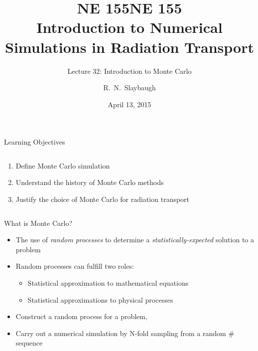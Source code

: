 \documentclass[xcolor=x11names,compress]{beamer}
\title{NE 155}
\author{R.\ N.\ Slaybaugh}
\date{April 13, 2015}
\renewcommand{\(}{\begin{columns}}
\renewcommand{\)}{\end{columns}}
\newcommand{\<}[1]{\begin{column}{#1}}
\renewcommand{\>}{\end{column}}
\begin{document}
\begin{frame}
\title{NE 155\\Introduction to Numerical Simulations in Radiation Transport}
\subtitle{Lecture 32: Introduction to Monte Carlo}
\titlepage
\end{frame}

\begin{frame}{Learning Objectives}

\begin{columns}
  \begin{column}{0.6\textwidth}
    \begin{enumerate}
    \item Define Monte Carlo simulation
    \item Understand the history of Monte Carlo methods
    \item Justify the choice of Monte Carlo for radiation transport
    \end{enumerate}
  \end{column}
  \begin{column}{0.4\textwidth}
  	\begin{figure}
  	\end{figure}
  \end{column}
\end{columns}
\end{frame}


\begin{frame}{What is Monte Carlo?}

  \begin{itemize}
  \item The use of \textit{random processes} to determine a 
        \textit{statistically-expected} solution to a problem
  \vspace*{1em}
  \item Random processes can fulfill two roles:
  \begin{itemize}
    \item Statistical approximation to \alert{mathematical equations}
    \item Statistical approximations to \alert{physical processes}
  \end{itemize}   
 \vspace*{1em} 
  \item Construct a random process for a problem, 
  \item Carry out a numerical simulation by N-fold sampling from a random \# sequence
\end{itemize}
\end{frame}
\end{document}
